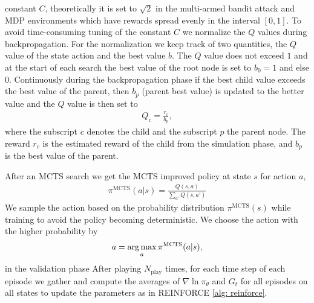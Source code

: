 constant $C$, theoretically it is set to $\sqrt{2}$ in the multi-armed bandit
attack and MDP environments which have rewards spread evenly in the interval
$[0, 1]$. To avoid time-consuming tuning of the constant $C$ we normalize the
$Q$ values during backpropagation. For the normalization we keep track of two
quantities, the $Q$ value of the state action and the best value $b$. The $Q$
value does not exceed $1$ and at the start of each search the best value of
the root node is set to $b_0 = 1$ and else $0$. Continuously during the
backpropagation phase if the best child value exceeds the best value
of the parent, then $b_p$ (parent best value) is updated to the better value
and the $Q$ value is then set to
\begin{align}
    Q_c = \frac{r_c}{b_p},
\end{align}
where the subscript $c$ denotes the child and the subscript $p$ the parent
node. The reward $r_c$ is the estimated reward of the child from the
simulation phase, and $b_p$ is the best value of the parent.
\newline

After an MCTS search we get the MCTS improved policy at state $s$
for action $a$,
\begin{align}
    \pi^{\text{MCTS}}(a|s) = \frac{Q(s, a)}{\sum_{a'}Q(s, a')} \label{eq: mcts_improved}
\end{align}
We sample the action based on the probability distribution $\pi^\text{MCTS}
(s)$ while training to avoid the policy becoming deterministic. We choose the
action with the higher probability by
\begin{align}
    a = \operatorname*{arg\,max}_a \pi^{\text{MCTS}}(a|s),
\end{align}
in the validation phase After playing $N_{\text{play}}$ times, for each time
step of each episode we gather and compute the averages of $\nabla \ln
\pi_\theta$ and $G_t$ for all episodes on all states to update the parameters
as in REINFORCE \ref{alg: reinforce}.
